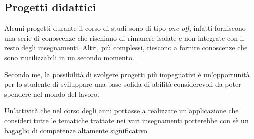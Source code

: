 \subsection{Progetti didattici}

Alcuni progetti durante il corso di studi sono di tipo \emph{one-off}, infatti
forniscono una serie di conoscenze che rischiano di rimanere isolate e non
integrate con il resto degli insegnamenti. Altri, più complessi, riescono a
fornire conoscenze che sono riutilizzabili in un secondo momento.

Secondo me, la possibilità di svolgere progetti più impegnativi è
un'opportunità per lo studente di sviluppare una base solida di abilità
considerevoli da poter spendere nel mondo del lavoro.

Un'attività che nel corso degli anni portasse a realizzare un'applicazione che
consideri tutte le tematiche trattate nei vari insegnamenti porterebbe con sè
un bagaglio di competenze altamente significativo.
